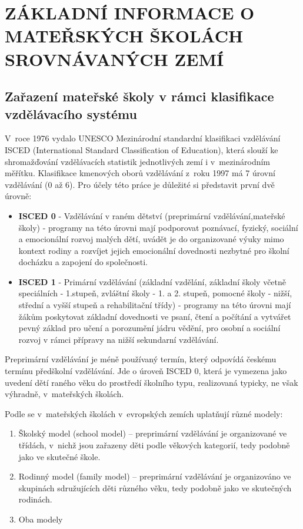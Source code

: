	
\chapter{ZÁKLADNÍ INFORMACE O MATEŘSKÝCH ŠKOLÁCH SROVNÁVANÝCH ZEMÍ}

	\section{Zařazení mateřské školy v rámci klasifikace vzdělávacího systému}

		V roce 1976 vydalo UNESCO Mezinárodní standardní klasifikaci vzdělávání ISCED (International Standard Classification of Education), která slouží ke shromažďování vzdělávacích statistik jednotlivých zemí i v mezinárodním měřítku. Klasifikace kmenových oborů vzdělávání z roku 1997 má 7 úrovní vzdělávání (0 až 6).
		Pro účely této práce je důležité si představit první dvě úrovně:

\begin{itemize}
\item [] \textbf{ISCED 0} - Vzdělávání v raném dětství (preprimární vzdělávání,mateřské školy) - programy na této úrovni mají podporovat poznávací, fyzický, sociální a emocionální rozvoj malých dětí, uvádět je do organizované výuky mimo kontext rodiny a rozvíjet jejich emocionální dovednosti nezbytné pro školní docházku a zapojení do společnosti. 
\item [] \textbf{ISCED 1} - Primární vzdělávání (základní vzdělání, základní školy včetně speciálních - 1.stupeň, zvláštní školy - 1. a 2. stupeň, pomocné školy - nižší, střední a vyšší stupeň a rehabilitační třídy) - programy na této úrovni mají žákům poskytovat základní dovednosti ve psaní, čtení a počítání a vytvářet pevný základ pro učení a porozumění jádru vědění, pro osobní a sociální rozvoj v rámci přípravy na nižší sekundarní vzdělávání. \citep{ISCED}
\end{itemize}

		Preprimární vzdělávání je méně používaný termín, který odpovídá českému termínu předškolní vzdělávání. Jde o úroveň ISCED 0, která je vymezena jako uvedení dětí raného věku do prostředí školního typu, realizovaná typicky, ne však výhradně, v mateřských školách.

		Podle \citet{KeyData} se v mateřských školách v evropských zemích uplatňují různé modely:
		\begin{enumerate}[1)]
		\item Školský model (school model) – preprimární vzdělávání je organizované ve třídách, v nichž jsou zařazeny děti podle věkových kategorií, tedy podobně jako ve skutečné škole. 
		\item Rodinný model (family model) – preprimární vzdělávání je organizováno ve skupinách sdružujících děti různého věku, tedy podobně jako ve skutečných rodinách. 
		\item Oba modely
		\end{enumerate}

